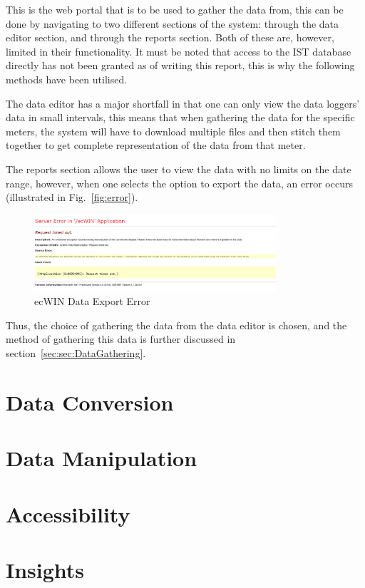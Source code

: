 \documentclass[12pt,onecolumn]{IEEEtran}
\begin{document}
This is the web portal that is to be used to gather the data from, this can be done by navigating to two different sections of the system: through the data editor section, and through the reports section. Both of these are, however, limited in their functionality. It must be noted that access to the IST database directly has not been granted as of writing this report, this is why the following methods have been utilised.

The data editor has a major shortfall in that one can only view the data loggers' data in small intervals, this means that when gathering the data for the specific meters, the system will have to download multiple files and then stitch them together to get complete representation of the data from that meter.

The reports section allows the user to view the data with no limits on the date range, however, when one selects the option to export the data, an error occurs (illustrated in Fig.~\ref{fig:error}). 

\begin{center}
    \begin{figure}[htb]
        \centering
        \includegraphics[width=0.8\textwidth]{ecwinerror.png}
        \caption{ecWIN Data Export Error}
        \label{fig:ecwinerror}
    \end{figure}
\end{center}

Thus, the choice of gathering the data from the data editor is chosen, and the method of gathering this data is further discussed in section~\ref{sec:sec:DataGathering}.


\section{Data Conversion} \label{sec:DataConversion}

\section{Data Manipulation} \label{sec:DataManipulation}

\section{Accessibility} \label{sec:Accessibility}

\section{Insights} \label{sec:Insights}


\cite{datasite}



\end{document}
